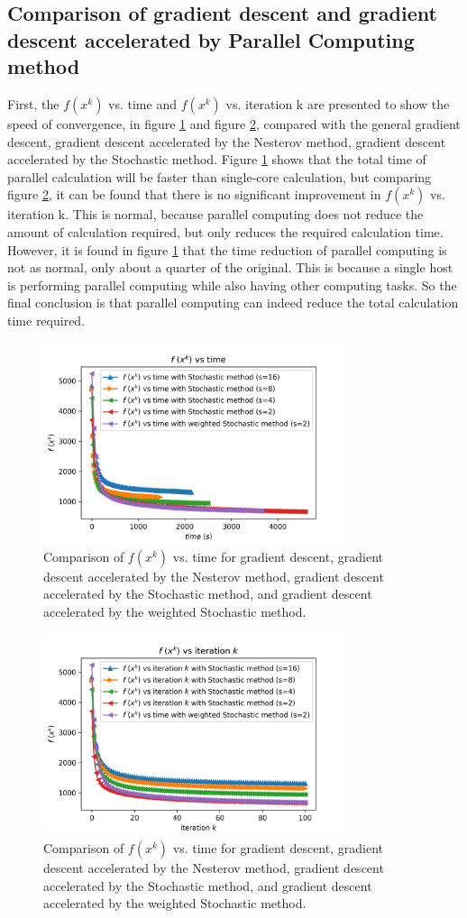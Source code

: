 \documentclass{article}
\begin{document}
\subsection{Comparison of gradient descent and gradient descent accelerated by Parallel Computing method}
First, the $f(x^{k})$ vs. time and  $f(x^{k})$ vs. iteration k are presented to show the speed of convergence, in figure \ref{img25} and figure \ref{img26}, compared with the general gradient descent, gradient descent accelerated by the Nesterov method, gradient descent accelerated by the Stochastic method. Figure \ref{img25} shows that the total time of parallel calculation will be faster than single-core calculation, but comparing figure \ref{img26}, it can be found that there is no significant improvement in $f(x^{k})$ vs. iteration k. This is normal, because parallel computing does not reduce the amount of calculation required, but only reduces the required calculation time. However, it is found in figure \ref{img25} that the time reduction of parallel computing is not as normal, only about a quarter of the original. This is because a single host is performing parallel computing while also having other computing tasks. So the final conclusion is that parallel computing can indeed reduce the total calculation time required.
\begin{figure}[h]
  \includegraphics[width=3.5in]{pic25.png}
  \centering
  \caption{Comparison of $f(x^{k})$ vs. time for gradient descent, gradient descent accelerated by the Nesterov method, gradient descent accelerated by the Stochastic method, and gradient descent accelerated by the weighted Stochastic method.}
  \label{img25}
\end{figure}
\begin{figure}[h]
  \includegraphics[width=3.5in]{pic26.png}
  \centering
  \caption{Comparison of $f(x^{k})$ vs. time for gradient descent, gradient descent accelerated by the Nesterov method, gradient descent accelerated by the Stochastic method, and gradient descent accelerated by the weighted Stochastic method.}
  \label{img26}
\end{figure}
\end{document}

